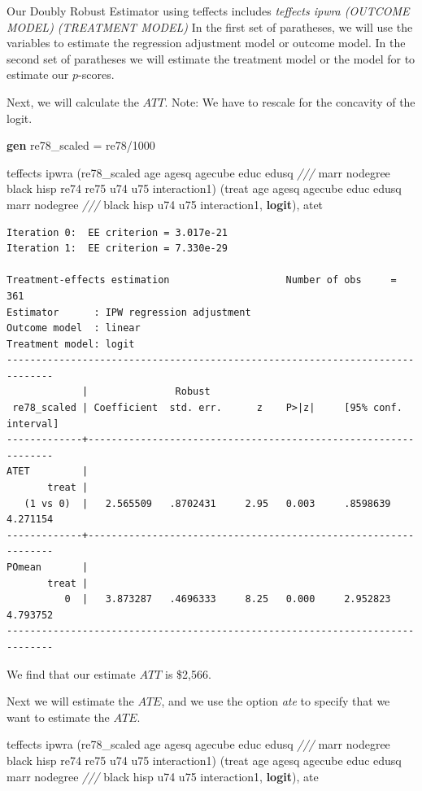 \documentclass[
]{book}
\newenvironment{Shaded}{\begin{snugshade}}{\end{snugshade}}
\newcommand{\BaseNTok}[1]{\textcolor[rgb]{0.00,0.00,0.81}{#1}}
\newcommand{\CommentTok}[1]{\textcolor[rgb]{0.56,0.35,0.01}{\textit{#1}}}
\newcommand{\KeywordTok}[1]{\textcolor[rgb]{0.13,0.29,0.53}{\textbf{#1}}}
\newcommand{\NormalTok}[1]{#1}
\begin{document}
Our Doubly Robust Estimator using teffects includes \emph{teffects ipwra (OUTCOME MODEL) (TREATMENT MODEL)} In the first set of paratheses, we will use the variables to estimate the regression adjustment model or outcome model. In the second set of paratheses we will estimate the treatment model or the model for to estimate our \(p\)-scores.

Next, we will calculate the \(ATT\). Note: We have to rescale for the concavity of the logit.

\begin{Shaded}
\begin{Highlighting}[]
\KeywordTok{gen}\NormalTok{ re78\_scaled = re78/1000}

\NormalTok{teffects ipwra (re78\_scaled age agesq agecube educ edusq }\CommentTok{///}
\NormalTok{marr nodegree }\BaseNTok{black}\NormalTok{ hisp re74 re75 u74 u75 interaction1) (treat age agesq agecube educ edusq marr nodegree }\CommentTok{///}
\BaseNTok{black}\NormalTok{ hisp u74 u75 interaction1, }\KeywordTok{logit}\NormalTok{), atet}
\end{Highlighting}
\end{Shaded}

\begin{verbatim}
Iteration 0:  EE criterion = 3.017e-21  
Iteration 1:  EE criterion = 7.330e-29  

Treatment-effects estimation                    Number of obs     =        361
Estimator      : IPW regression adjustment
Outcome model  : linear
Treatment model: logit
------------------------------------------------------------------------------
             |               Robust
 re78_scaled | Coefficient  std. err.      z    P>|z|     [95% conf. interval]
-------------+----------------------------------------------------------------
ATET         |
       treat |
   (1 vs 0)  |   2.565509   .8702431     2.95   0.003     .8598639    4.271154
-------------+----------------------------------------------------------------
POmean       |
       treat |
          0  |   3.873287   .4696333     8.25   0.000     2.952823    4.793752
------------------------------------------------------------------------------
\end{verbatim}

We find that our estimate \(ATT\) is \$2,566.

Next we will estimate the \(ATE\), and we use the option \emph{ate} to specify that we want to estimate the \(ATE\).

\begin{Shaded}
\begin{Highlighting}[]
\NormalTok{teffects ipwra (re78\_scaled age agesq agecube educ edusq }\CommentTok{///}
\NormalTok{marr nodegree }\BaseNTok{black}\NormalTok{ hisp re74 re75 u74 u75 interaction1) (treat age agesq agecube educ edusq marr nodegree }\CommentTok{///}
\BaseNTok{black}\NormalTok{ hisp u74 u75 interaction1, }\KeywordTok{logit}\NormalTok{), ate}
\end{Highlighting}
\end{Shaded}
\end{document}
